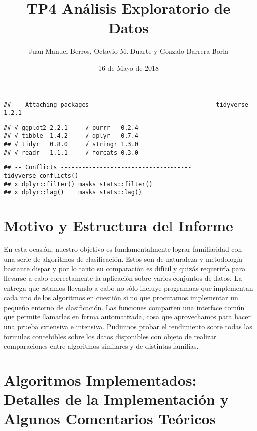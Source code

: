 \documentclass[]{article}
\title{TP4 Análisis Exploratorio de Datos}
\author{Juan Manuel Berros, Octavio M. Duarte y Gonzalo Barrera Borla}
\date{16 de Mayo de 2018}
\begin{document}
\maketitle

\begin{verbatim}
## -- Attaching packages ---------------------------------- tidyverse 1.2.1 --
\end{verbatim}

\begin{verbatim}
## √ ggplot2 2.2.1     √ purrr   0.2.4
## √ tibble  1.4.2     √ dplyr   0.7.4
## √ tidyr   0.8.0     √ stringr 1.3.0
## √ readr   1.1.1     √ forcats 0.3.0
\end{verbatim}

\begin{verbatim}
## -- Conflicts ------------------------------------- tidyverse_conflicts() --
## x dplyr::filter() masks stats::filter()
## x dplyr::lag()    masks stats::lag()
\end{verbatim}

\hypertarget{motivo-y-estructura-del-informe}{%
\section{Motivo y Estructura del
Informe}\label{motivo-y-estructura-del-informe}}

En esta ocasión, nuestro objetivo es fundamentalmente lograr
familiaridad con una serie de algoritmos de clasificación. Estos son de
naturaleza y metodología bastante dispar y por lo tanto su comparación
es difícil y quizás requeriría para llevarse a cabo correctamente la
aplicación sobre varios conjuntos de datos. La entrega que estamos
llevando a cabo no sólo incluye programaas que implementan cada uno de
los algoritmos en cuestión si no que procuramos implementar un pequeño
entorno de clasificación. Las funciones comparten una interface común
que permite llamarlas en forma automatizada, cosa que aprovechamos para
hacer una prueba extensiva e intensiva. Pudimnos probar el rendimiento
sobre todas las formulas concebibles sobre los datos disponibles con
objeto de realizar comparaciones entre algoritmos similares y de
distintas familias.

\hypertarget{algoritmos-implementados-detalles-de-la-implementacion-y-algunos-comentarios-teoricos}{%
\section{Algoritmos Implementados: Detalles de la Implementación y
Algunos Comentarios
Teóricos}\label{algoritmos-implementados-detalles-de-la-implementacion-y-algunos-comentarios-teoricos}}
\end{document}
